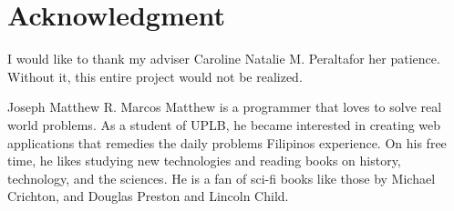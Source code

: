 \documentclass[journal]{IEEEtran}
\newcommand{\ADVISEE}{Joseph Matthew R. Marcos}
\newcommand{\ADVISER}{Caroline Natalie M. Peralta}
\begin{document}
\newpage
\section*{Acknowledgment}
I would like to thank my adviser \ADVISER for her patience. Without it, this entire project would not be realized.
\begin{biography}{\ADVISEE}
    Matthew is a programmer that loves to solve real world problems. As a student of UPLB, he became interested in creating
    web applications that remedies the daily problems Filipinos experience. On his free time, he likes studying new
    technologies and reading books on history, technology, and the sciences. He is a fan of sci-fi books like those by
    Michael Crichton, and Douglas Preston and Lincoln Child.
\end{biography}


\newpage
% 



\newpage
\appendices
\end{document}
